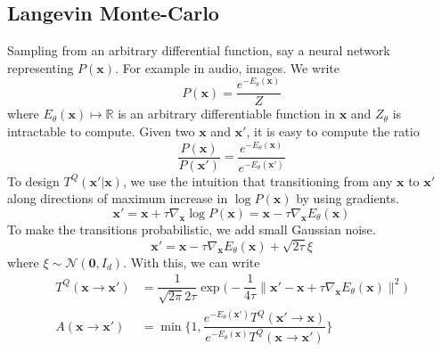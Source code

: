 \subsection{Langevin Monte-Carlo}
Sampling from an arbitrary differential function, say a neural network representing $P(\mathbf x)$. For example in audio, images. We write
\begin{equation}
	P(\mathbf x) = \dfrac{e^{-E_\theta(\mathbf x)}}{Z}
\end{equation}
where $E_\theta(\mathbf x) \mapsto \mathbb R$ is an arbitrary differentiable function in $\mathbf x$ and $Z_\theta$ is intractable to compute. Given two $\mathbf x$ and $\mathbf x'$, it is easy to compute the ratio
\begin{equation}
	\dfrac{P(\mathbf x)}{P(\mathbf x')} = \dfrac{e^{-E_\theta(\mathbf x)}}{e^{-E_\theta(\mathbf x')}}
\end{equation}
To design $T^Q(\mathbf x' | \mathbf x)$, we use the intuition that transitioning from any $\mathbf x$ to $\mathbf x'$ along directions of maximum increase in $\log P(\mathbf x)$ by using gradients.
\begin{equation}
	\mathbf x' = \mathbf x + \tau \nabla_\mathbf{x} \log P(\mathbf x) = \mathbf x - \tau \nabla_\mathbf x E_\theta(\mathbf x)
\end{equation}
To make the transitions probabilistic, we add small Gaussian noise.
\begin{equation}
	\mathbf x' = \mathbf x - \tau \nabla_\mathbf x E_\theta(\mathbf x) + \sqrt{2\tau} \xi
\end{equation}
where $\xi \sim \mathcal{N}(\mathbf 0, I_d)$. With this, we can write
\begin{align}
	T^Q(\mathbf x \to \mathbf x') &= \dfrac{1}{\sqrt{2\pi} 2\tau} \exp\bigg(-\dfrac{1}{4\tau} \|\mathbf x' - \mathbf x + \tau\nabla_\mathbf{x} E_\theta(\mathbf x) \|^2\bigg) \\
	A(\mathbf x \to \mathbf x') &= \min\bigg\{1, \dfrac{e^{-E_\theta(\mathbf x')} T^Q(\mathbf x' \to \mathbf x)}{e^{-E_\theta(\mathbf x)}T^Q(\mathbf x \to \mathbf x')}\bigg\}
\end{align}